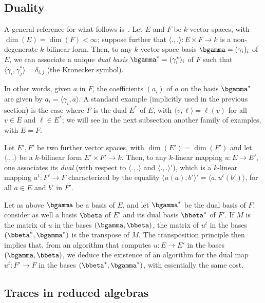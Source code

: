 \documentclass{sig-alternate}
\newcounter{algo}
\newcommand{\ang}[1]{\langle#1\rangle}
\begin{document}

\subsection{Duality}\label{ssec:duality}

A general reference for what follows
is~\cite[Ch.~IX.1.8]{BourbakiAlgCom9}. Let $E$ and $F$ be $k$-vector
spaces, with $\dim(E)=\dim(F) < \infty$; suppose further that
$\ang{.,.}: E\times F \to k$ is a non-degenerate $k$-bilinear form.
Then, to any $k$-vector space basis $\bgamma=(\gamma_i)_i$ of $E$, we
can associate a unique \emph{dual basis}
$\bgamma^\ast=(\gamma_i^\ast)_i$ of $F$ such that $
\ang{\gamma_i,\gamma^\ast_j} = \delta_{i,j}$ (the Kronecker symbol).

In other words, given $a$ in $F$, the coefficients $(a_i)$ of $a$ on
the basis $\bgamma^\ast$ are given by $a_i=\ang{\gamma_i, a}$. A
standard example (implicitly used in the previous section) is the case
where $F$ is the dual $E^*$ of $E$, with $\ang{v,\ell}=\ell(v)$ for
all $v\in E$ and $\ell \in E^*$; we will see in the next subsection
another family of examples, with $E=F$.

Let $E',F'$ be two further vector spaces, with $\dim(E')=\dim(F')$ and
let $\ang{.,.}$ be a $k$-bilinear form $E'\times F' \to k$. Then, to
any $k$-linear mapping $u:E\to E'$, one associates its {\em dual}
(with respect to $\ang{.,.}$ and $\ang{.,.}'$), which is a $k$-linear
mapping $u^t: F' \to F$ characterized by the equality
$\ang{u(a),b'}'=\ang{a,u^t(b')}$, for all $a\in E$ and $b'$ in $F'$.

Let as above $\bgamma$ be a basis of $E$, and let $\bgamma^\ast$ be
the dual basis of $F$; consider as well a basis $\bbeta$ of $E'$ and
its dual basis $\bbeta^\ast$ of $F'$. If $M$ is the matrix of $u$ in
the bases $(\bgamma,\bbeta)$, the matrix of $u^t$ in the bases
$(\bbeta^\ast,\bgamma^\ast)$ is the transpose of $M$. The
transposition principle then implies that, from an algorithm that
computes $u: E \to E'$ in the bases $(\bgamma,\bbeta)$, we deduce the
existence of an algorithm for the dual map $u^t: F' \to F$ in the
bases $(\bbeta^\ast,\bgamma^\ast)$, with essentially the same cost.


\subsection{Traces in reduced algebras}
\end{document}
